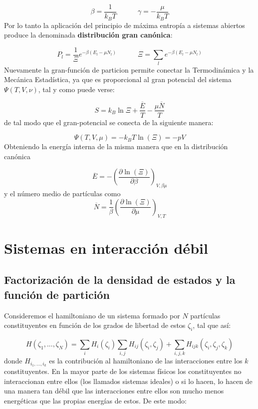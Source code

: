 \documentclass[12pt,a4paper]{article}
\numberwithin{equation}{section}
\numberwithin{figure}{section}
\newcommand{\tquad}{\quad \quad \quad}
\newcommand{\parentesis}[1]{\left( #1  \right)}
\newcommand{\parciales}[2]{\frac{\partial #1}{\partial #2}}
\theoremstyle{definition}
\begin{document}
\begin{equation}
\beta = \frac{1}{k_B T} \tquad \gamma = - \frac{\mu}{k_B T}
\end{equation}
Por lo tanto la aplicación del principio de máxima entropía a sistemas abiertos produce la denominada \textbf{distribución gran canónica}:

\begin{equation}
P_l = \frac{1}{\Xi} e^{- \beta (E_l - \mu N_l)} \tquad
\Xi = \sum_l e^{- \beta (E_l - \mu N_l)}
\end{equation}
Nuevamente la gran-función de particion permite conectar la Termodinámica y la Mecánica Estadística, ya que es proporcional al gran potencial del sistema $\Psi (T,V,\nu)$, tal y como puede verse:

\begin{equation}
S = k_B \ln \Xi + \frac{\overline{E}}{T} - \frac{\mu \overline{N}}{T}
\end{equation}
de tal modo que el gran-potencial se conecta de la siguiente manera:

\begin{equation}
\Psi (T,V,\mu) = - k_B T \ln (\Xi) = - pV
\end{equation}
Obteniendo la energía interna de la misma manera que en la distribución canónica

\begin{equation}
\overline{E} =- \parentesis{\parciales{\ln (\Xi)}{\beta}}_{V,\beta \mu}
\end{equation}
y el número medio de partículas como 
\begin{equation}
\overline{N} = \frac{1}{\beta} \parentesis{\parciales{\ln (\Xi)}{\mu}}_{V,T}
\end{equation}

\newpage

\section{Sistemas en interacción débil}
\subsection{Factorización de la densidad de estados y la función de partición}
Consideremos el hamiltoniano de un sistema formado por $N$ partículas constituyentes en función de los grados de libertad de estos $\zeta_i$, tal que así:

\begin{equation}
H(\zeta_1,...,\zeta_N) = \sum_i H_i (\zeta_i) \sum_{i,j} H_{ij} (\zeta_i,\zeta_j) + \sum_{i,j,k} H_{ijk} (\zeta_i,\zeta_j,\zeta_k)
\end{equation}
donde $H_{i_1,...,i_k}$ es la contribución al hamiltoniano de las interacciones entre los $k$ constituyentes. En la mayor parte de los sistemas físicos los constituyentes no interaccionan entre ellos (los llamados sistemas ideales) o si lo hacen, lo hacen  de una manera tan débil que las interacciones entre ellos son mucho menos energéticas que las propias energías de estos. De este modo:
\end{document}
